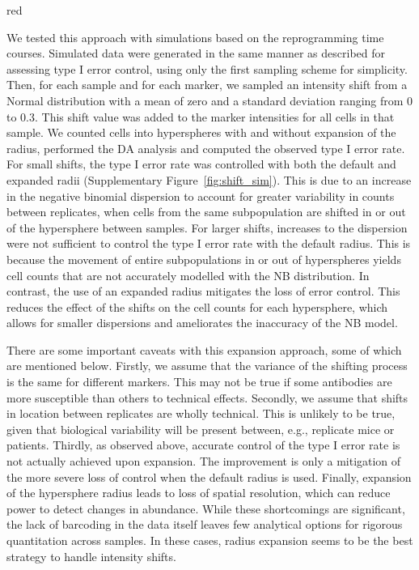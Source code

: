 \documentclass{article}
\begin{document}
\begin{color}{red}

We tested this approach with simulations based on the reprogramming time courses.
Simulated data were generated in the same manner as described for assessing type I error control, using only the first sampling scheme for simplicity.
Then, for each sample and for each marker, we sampled an intensity shift from a Normal distribution with a mean of zero and a standard deviation ranging from 0 to 0.3.
This shift value was added to the marker intensities for all cells in that sample.
We counted cells into hyperspheres with and without expansion of the radius, performed the DA analysis and computed the observed type I error rate.
For small shifts, the type I error rate was controlled with both the default and expanded radii (Supplementary Figure~\ref{fig:shift_sim}).
This is due to an increase in the negative binomial dispersion to account for greater variability in counts between replicates, when cells from the same subpopulation are shifted in or out of the hypersphere between samples. 
For larger shifts, increases to the dispersion were not sufficient to control the type I error rate with the default radius.
This is because the movement of entire subpopulations in or out of hyperspheres yields cell counts that are not accurately modelled with the NB distribution.
In contrast, the use of an expanded radius mitigates the loss of error control.
This reduces the effect of the shifts on the cell counts for each hypersphere, which allows for smaller dispersions and ameliorates the inaccuracy of the NB model.

There are some important caveats with this expansion approach, some of which are mentioned below.
Firstly, we assume that the variance of the shifting process is the same for different markers.
This may not be true if some antibodies are more susceptible than others to technical effects.
Secondly, we assume that shifts in location between replicates are wholly technical.
This is unlikely to be true, given that biological variability will be present between, e.g., replicate mice or patients.
Thirdly, as observed above, accurate control of the type I error rate is not actually achieved upon expansion.
The improvement is only a mitigation of the more severe loss of control when the default radius is used.
Finally, expansion of the hypersphere radius leads to loss of spatial resolution, which can reduce power to detect changes in abundance.
While these shortcomings are significant, the lack of barcoding in the data itself leaves few analytical options for rigorous quantitation across samples.
In these cases, radius expansion seems to be the best strategy to handle intensity shifts.
\end{color}
\end{document}
